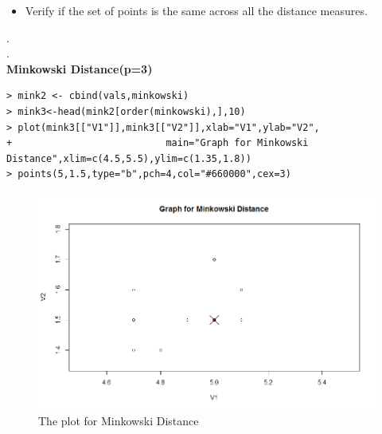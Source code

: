 \documentclass[fontsize=10pt]{scrartcl}
\begin{document}
\begin{enumerate}
\begin{enumerate}
\begin{itemize}
					\item
					Verify if the set of points is the same across all the distance measures.
				\end{itemize}
				. \\
				. \\
				\textbf{\large Minkowski Distance(p=3)} \\
\begin{verbatim}
> mink2 <- cbind(vals,minkowski)
> mink3<-head(mink2[order(minkowski),],10)
> plot(mink3[["V1"]],mink3[["V2"]],xlab="V1",ylab="V2",
+							main="Graph for Minkowski Distance",xlim=c(4.5,5.5),ylim=c(1.35,1.8))
> points(5,1.5,type="b",pch=4,col="#660000",cex=3)
\end{verbatim}
			\begin{figure}[H]
				\begin{center}
					\includegraphics[scale=.5]{resources/minkowski.png}
					\caption{The plot for Minkowski Distance}
				\end{center}
			\end{figure}


\end{enumerate}
\end{enumerate}
\end{document}
